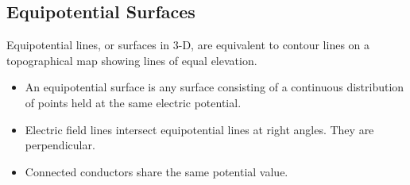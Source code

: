    \subsection{Equipotential Surfaces}
   Equipotential lines, or surfaces in 3-D, are equivalent to contour lines on a topographical map showing lines of equal elevation.
   \begin{itemize}
   \item An equipotential surface is any surface consisting of a continuous distribution of points held at the same electric potential.
   \item Electric field lines intersect equipotential lines at right angles.  They are perpendicular.
   \item Connected conductors share the same potential value.
   \end{itemize} 
